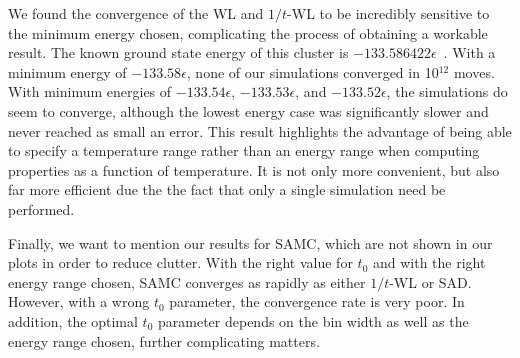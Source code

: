 \documentclass[letterpaper,twocolumn,amsmath,amssymb,pre,aps,10pt]{revtex4-1}
\begin{document}

We found the convergence of the WL and $1/t$-WL to be incredibly
sensitive to the minimum energy chosen, complicating the process of
obtaining a workable result.  The known ground state energy of this
cluster is $-133.586422\epsilon$~\cite{northby1987structure,
  wales1997global}.  With a minimum energy of $-133.58\epsilon$, none
of our simulations converged in 10$^{12}$ moves.  With minimum
energies of $-133.54\epsilon$, $-133.53\epsilon$, and
$-133.52\epsilon$, the simulations do seem to converge, although the
lowest energy case was significantly slower and never reached as small
an error.  This result highlights the advantage of being able to
specify a temperature range rather than an energy range when computing
properties as a function of temperature.  It is not only more
convenient, but also far more efficient due the the fact that only a
single simulation need be performed.


Finally, we want to mention our results for SAMC, which are not shown
in our plots in order to reduce clutter.  With the right value for
$t_0$ and with the right energy range chosen, SAMC converges as
rapidly as either $1/t$-WL or SAD.  However, with a wrong $t_0$
parameter, the convergence rate is very poor.  In addition, the
optimal $t_0$ parameter depends on the bin width as well as the energy
range chosen, further complicating matters.
\end{document}
